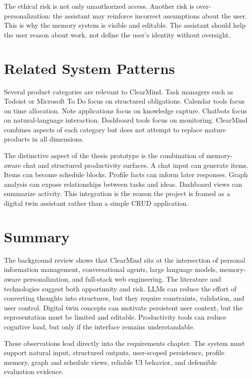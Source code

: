 The ethical risk is not only unauthorized access. Another risk is over-personalization: the assistant may reinforce incorrect assumptions about the user. This is why the memory system is visible and editable. The assistant should help the user reason about work, not define the user's identity without oversight.

\section{Related System Patterns}

Several product categories are relevant to ClearMind. Task managers such as Todoist or Microsoft To Do focus on structured obligations. Calendar tools focus on time allocation. Note applications focus on knowledge capture. Chatbots focus on natural-language interaction. Dashboard tools focus on monitoring. ClearMind combines aspects of each category but does not attempt to replace mature products in all dimensions.

The distinctive aspect of the thesis prototype is the combination of memory-aware chat and structured productivity surfaces. A chat input can generate items. Items can become schedule blocks. Profile facts can inform later responses. Graph analysis can expose relationships between tasks and ideas. Dashboard views can summarize activity. This integration is the reason the project is framed as a digital twin assistant rather than a simple CRUD application.

\section{Summary}

The background review shows that ClearMind sits at the intersection of personal information management, conversational agents, large language models, memory-aware personalization, and full-stack web engineering. The literature and technologies suggest both opportunity and risk. LLMs can reduce the effort of converting thoughts into structures, but they require constraints, validation, and user control. Digital twin concepts can motivate persistent user context, but the representation must be limited and editable. Productivity tools can reduce cognitive load, but only if the interface remains understandable.

These observations lead directly into the requirements chapter. The system must support natural input, structured outputs, user-scoped persistence, profile memory, graph and schedule views, reliable UI behavior, and defensible evaluation evidence.
